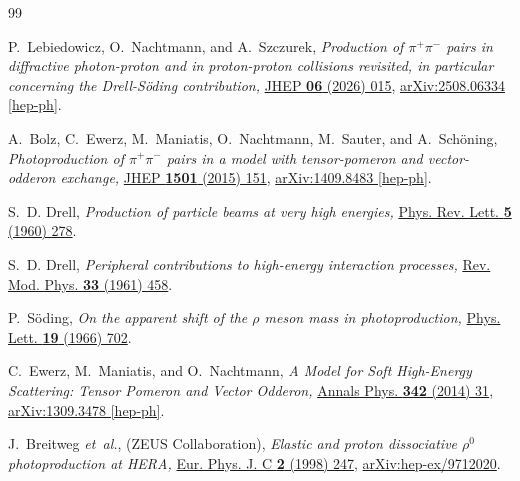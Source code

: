 \documentclass[a4paper,11pt]{article}
\begin{document}


\begin{thebibliography}{99}

P.~Lebiedowicz, O.~Nachtmann, and A.~Szczurek,
{\em {Production of $\pi^{+} \pi^{-}$ pairs in diffractive photon-proton and in proton-proton collisions revisited, in particular concerning the Drell-S{\"o}ding contribution},}
\href{http://dx.doi.org/10.1007/JHEP06(2026)015}{JHEP {\bfseries 06} (2026) 015},
\href{http://arxiv.org/abs/2508.06334}{{arXiv:2508.06334 [hep-ph]}}.

A.~Bolz, C.~Ewerz, M.~Maniatis, O.~Nachtmann, M.~Sauter, and A.~Sch{\"o}ning,
  {\em {Photoproduction of $\pi^{+} \pi^{-}$ pairs in a model with
  tensor-pomeron and vector-odderon exchange},}
  \href{http://dx.doi.org/10.1007/JHEP01(2015)151}{JHEP {\bfseries 1501} (2015)
  151},
\href{http://arxiv.org/abs/1409.8483}{{arXiv:1409.8483 [hep-ph]}}.

S.~D. Drell, {\em {Production of particle beams at very high energies},}
\href{http://dx.doi.org/10.1103/PhysRevLett.5.278}{Phys. Rev. Lett. {\bfseries 5}
  (1960) 278}.

S.~D. Drell, {\em {Peripheral contributions to high-energy interaction
  processes},}
\href{http://dx.doi.org/10.1103/RevModPhys.33.458}{Rev. Mod. Phys. {\bfseries 33}
  (1961) 458}.

P.~S{\"o}ding, {\em {On the apparent shift of the $\rho$ meson mass in
  photoproduction},}
\href{http://dx.doi.org/10.1016/0031-9163(66)90451-3}{Phys. Lett. {\bfseries 19}
  (1966) 702}.

C.~Ewerz, M.~Maniatis, and O.~Nachtmann, {\em {A Model for Soft High-Energy
  Scattering: Tensor Pomeron and Vector Odderon},}
  \href{https://doi.org/10.1016/j.aop.2013.12.001}{Annals Phys. {\bfseries 342} (2014) 31},
\href{http://arxiv.org/abs/1309.3478}{{arXiv:1309.3478 [hep-ph]}}.

J.~Breitweg {\em et~al.}, (ZEUS Collaboration), {\em {Elastic and proton
  dissociative $\rho^0$ photoproduction at HERA},}
  \href{http://dx.doi.org/10.1007/s100520050136}{Eur. Phys. J. C {\bfseries 2}
  (1998) 247},
  \href{http://arxiv.org/abs/hep-ex/9712020}{{arXiv:hep-ex/9712020}}.
  

\end{thebibliography}
\end{document}
